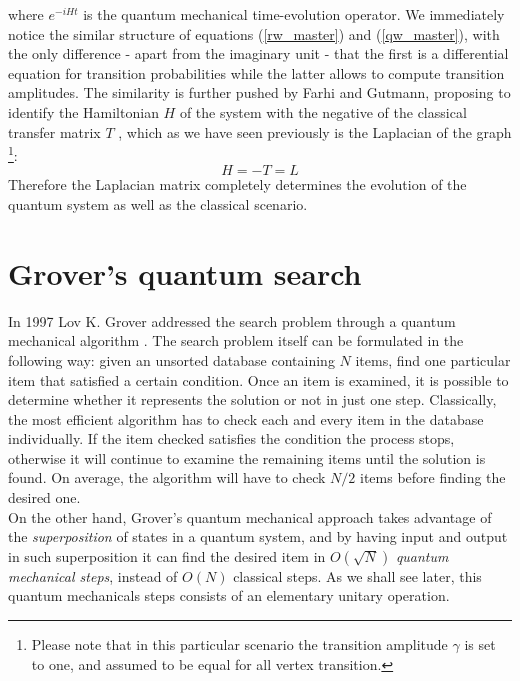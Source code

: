 where $e^{-iHt}$ is the quantum mechanical time-evolution operator. We immediately notice the similar structure of equations (\ref{rw_master}) and (\ref{qw_master}), with the only difference - apart from the imaginary unit - that the first is a differential equation for transition probabilities while the latter allows to compute transition amplitudes. The similarity is further pushed by Farhi and Gutmann, proposing to identify the Hamiltonian $H$ of the system with the negative of the classical transfer matrix $T$ \cite{Childs2001}, which as we have seen previously is the Laplacian of the graph \footnote{Please note that in this particular scenario the transition amplitude $\gamma$ is set to one, and assumed to be equal for all vertex transition.}:
\begin{equation}
  H = -T = L
  \label{qw_Hamiltonian}
\end{equation}
Therefore the Laplacian matrix completely determines the evolution of the quantum system as well as the classical scenario.



\section{Grover's quantum search}\label{sec:grover search}
In 1997 Lov K. Grover addressed the search problem through a quantum mechanical algorithm \cite{Grover1997}. The search problem itself can be formulated in the following way: given an unsorted database containing $N$ items, find one particular item that satisfied a certain condition. Once an item is examined, it is possible to determine whether it represents the solution or not in just one step.
Classically, the most efficient algorithm has to check each and every item in the database individually. If the item checked satisfies the condition the process stops, otherwise it will continue to examine the remaining items until the solution is found. On average, the algorithm will have to check $N/2$ items before finding the desired one.\\On the other hand, Grover's quantum mechanical approach takes advantage of the \textit{superposition} of states in a quantum system, and by having input and output in such superposition it can find the desired item in $O(\sqrt{N})$ \textit{quantum mechanical steps}, instead of $O(N)$ classical steps. As we shall see later, this quantum mechanicals steps consists of an elementary unitary operation.  \\

